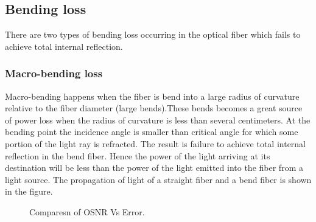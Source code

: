 \documentclass[12pt]{report}
\begin{document}
	\subsection{Bending loss}
	There are two types of bending loss occurring in the optical fiber which fails to achieve total internal reflection. 
	\subsubsection{Macro-bending loss}
	Macro-bending happens when the fiber is bend into a large radius of curvature relative to the fiber diameter (large bends).These bends becomes a great source of power loss when the radius of curvature is less than several centimeters. At the bending point the incidence angle is smaller than critical angle for which some portion of the light ray is refracted. The result is failure to achieve total internal reflection in the bend fiber. Hence the power of the light arriving at its destination will be less than the power of the light emitted into the fiber from a light source. The propagation of light of a straight fiber and a bend fiber is shown in the figure. 
	\begin{figure}[htbp]
		\caption{Comparesn of OSNR Vs Error.}
		\label{fig1}
	\end{figure}
	
\end{document}
